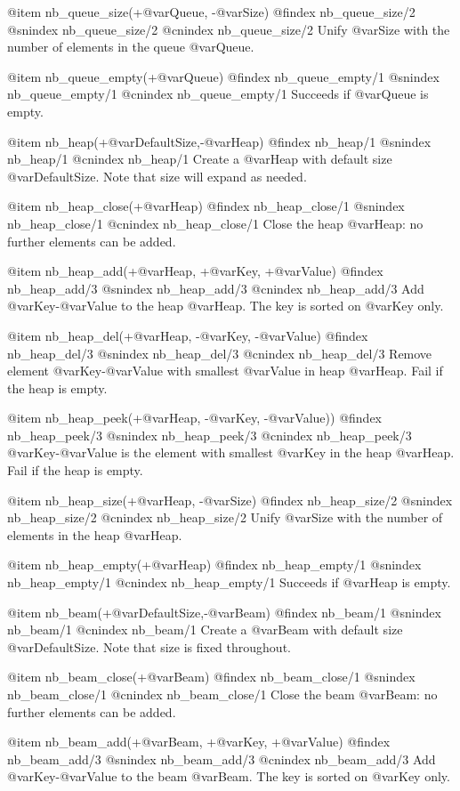 {{{{{{{{{@item nb_queue_size(+@var{Queue}, -@var{Size})
@findex nb_queue_size/2
@snindex nb_queue_size/2
@cnindex nb_queue_size/2
Unify @var{Size} with the number of elements in the queue  @var{Queue}.

@item nb_queue_empty(+@var{Queue})
@findex nb_queue_empty/1
@snindex nb_queue_empty/1
@cnindex nb_queue_empty/1
Succeeds if  @var{Queue} is empty.

@item nb_heap(+@var{DefaultSize},-@var{Heap})
@findex nb_heap/1
@snindex nb_heap/1
@cnindex nb_heap/1
Create a @var{Heap} with default size @var{DefaultSize}. Note that size
will expand as needed.

@item nb_heap_close(+@var{Heap})
@findex nb_heap_close/1
@snindex nb_heap_close/1
@cnindex nb_heap_close/1
Close the heap @var{Heap}: no further elements can be added.

@item nb_heap_add(+@var{Heap}, +@var{Key}, +@var{Value})
@findex nb_heap_add/3
@snindex nb_heap_add/3
@cnindex nb_heap_add/3
Add @var{Key}-@var{Value} to the heap @var{Heap}. The key is sorted on
@var{Key} only.

@item nb_heap_del(+@var{Heap}, -@var{Key}, -@var{Value})
@findex nb_heap_del/3
@snindex nb_heap_del/3
@cnindex nb_heap_del/3
Remove element @var{Key}-@var{Value} with smallest @var{Value} in heap
@var{Heap}. Fail if the heap is empty.

@item nb_heap_peek(+@var{Heap}, -@var{Key}, -@var{Value}))
@findex nb_heap_peek/3
@snindex nb_heap_peek/3
@cnindex nb_heap_peek/3
@var{Key}-@var{Value} is the element with smallest @var{Key} in the heap
@var{Heap}. Fail if the heap is empty.

@item nb_heap_size(+@var{Heap}, -@var{Size})
@findex nb_heap_size/2
@snindex nb_heap_size/2
@cnindex nb_heap_size/2
Unify @var{Size} with the number of elements in the heap  @var{Heap}.

@item nb_heap_empty(+@var{Heap})
@findex nb_heap_empty/1
@snindex nb_heap_empty/1
@cnindex nb_heap_empty/1
Succeeds if  @var{Heap} is empty.

@item nb_beam(+@var{DefaultSize},-@var{Beam})
@findex nb_beam/1
@snindex nb_beam/1
@cnindex nb_beam/1
Create a @var{Beam} with default size @var{DefaultSize}. Note that size
is fixed throughout.

@item nb_beam_close(+@var{Beam})
@findex nb_beam_close/1
@snindex nb_beam_close/1
@cnindex nb_beam_close/1
Close the beam @var{Beam}: no further elements can be added.

@item nb_beam_add(+@var{Beam}, +@var{Key}, +@var{Value})
@findex nb_beam_add/3
@snindex nb_beam_add/3
@cnindex nb_beam_add/3
Add @var{Key}-@var{Value} to the beam @var{Beam}. The key is sorted on
@var{Key} only.

}}}}}}}}}
